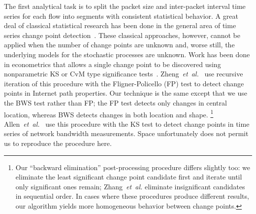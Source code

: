 \documentclass[conference]{IEEEtran}
\newcommand{\caps}[1]{{\small{#1}}}
\begin{document}
The first analytical task is to split the packet size and inter-packet interval time series for each flow into segments with consistent statistical behavior. A great deal of classical statistical research has been done in the general area of time series change point detection~\cite{Basseville93}. These classical approaches, however, cannot be applied when the number of change points are unknown and, worse still, the underlying models for the stochastic processes are unknown. Work has been done in econometrics that allows a single change point to be discovered using nonparametric \caps{KS} or \caps{CvM} type significance tests~\cite{Inoue01}. Zheng~\textit{et~al.}~\cite{Zhang01} use recursive iteration of this procedure with the Fligner-Policello (\caps{FP}) test to detect change points in Internet path properties. Our technique is the same except that we use the \caps{BWS} test rather than \caps{FP}; the \caps{FP} test detects only changes in central location, whereas \caps{BWS} detects changes in both location and shape.%
\footnote{Our ``backward elimination'' post-processing procedure differs slightly too: we eliminate the least significant change point candidate first and iterate until only significant ones remain; Zhang~\textit{et~al.} eliminate insignificant candidates in sequential order. In cases where these procedures produce different results, our algorithm yields more homogeneous behavior between change points.} %
Allen~\textit{et~al.}~\cite{Allen07} use this procedure with the \caps{KS} test to detect change points in time series of network bandwidth measurements.
Space unfortunately does not permit us to reproduce the procedure here.
%
%
\end{document}
